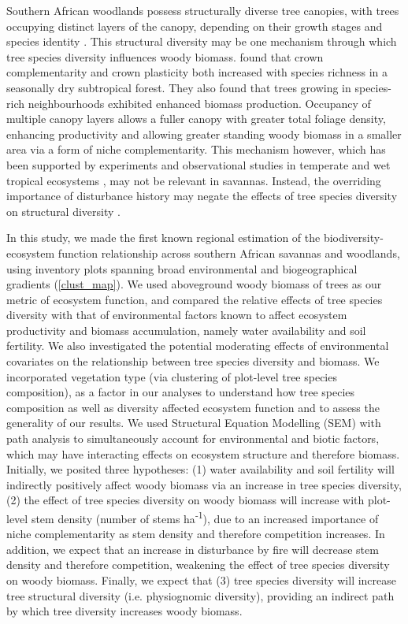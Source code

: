 \documentclass[11pt,a4paper]{article}
\begin{document}
Southern African woodlands possess structurally diverse tree canopies, with trees occupying distinct layers of the canopy, depending on their growth stages and species identity \citep{Solbrig1996}. This structural diversity may be one mechanism through which tree species diversity influences woody biomass. \citet{Kunz2019} found that crown complementarity and crown plasticity both increased with species richness in a seasonally dry subtropical forest. They also found that trees growing in species-rich neighbourhoods exhibited enhanced biomass production. Occupancy of multiple canopy layers allows a fuller canopy with  greater total foliage density, enhancing productivity and allowing greater standing woody biomass in a smaller area via a form of niche complementarity. This mechanism however, which has been supported by experiments and observational studies in temperate and wet tropical ecosystems \citep{Hardiman2011, Stark2012}, may not be relevant in savannas. Instead, the overriding importance of disturbance history may negate the effects of tree species diversity on structural diversity \citep{Grime2012}.

In this study, we made the first known regional estimation of the biodiversity-ecosystem function relationship across southern African savannas and woodlands, using inventory plots spanning broad environmental and biogeographical gradients (\autoref{clust_map}). We used aboveground woody biomass of trees as our metric of ecosystem function, and compared the relative effects of tree species diversity with that of environmental factors known to affect ecosystem productivity and biomass accumulation, namely water availability and soil fertility. We also investigated the potential moderating effects of environmental covariates on the relationship between tree species diversity and biomass. We incorporated vegetation type (via clustering of plot-level tree species composition), as a factor in our analyses to understand how tree species composition as well as diversity affected ecosystem function and to assess the generality of our results. We used Structural Equation Modelling (SEM) with path analysis to simultaneously account for environmental and biotic factors, which may have interacting effects on ecosystem structure and therefore biomass. Initially, we posited three hypotheses: (1) water availability and soil fertility will indirectly positively affect woody biomass via an increase in tree species diversity, (2) the effect of tree species diversity on woody biomass will increase with plot-level stem density (number of stems ha\textsuperscript{-1}), due to an increased importance of niche complementarity as stem density and therefore competition increases. In addition, we expect that an increase in disturbance by fire will decrease stem density and therefore competition, weakening the effect of tree species diversity on woody biomass. Finally, we expect that (3) tree species diversity will increase tree structural diversity (i.e. physiognomic diversity), providing an indirect path by which tree diversity increases woody biomass.
\end{document}
